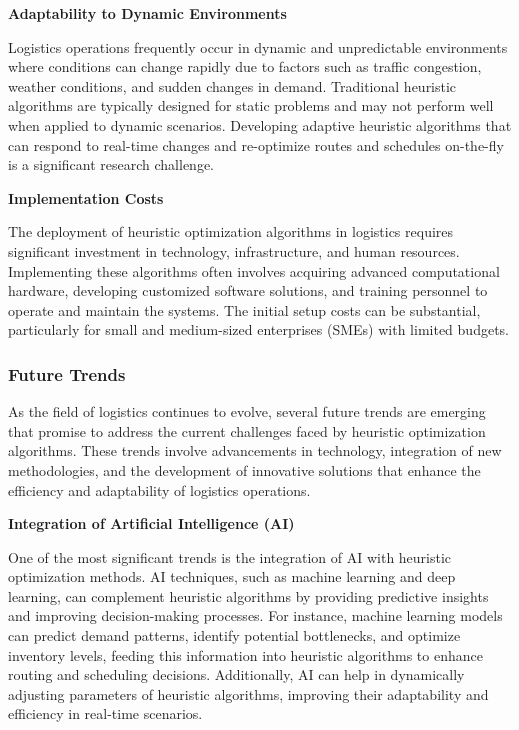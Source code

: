 \documentclass{article}
\begin{document}
    \textbf{Adaptability to Dynamic Environments}

    Logistics operations frequently occur in dynamic and unpredictable environments where conditions can change rapidly due to factors such as traffic congestion, weather conditions, and sudden changes in demand. Traditional heuristic algorithms are typically designed for static problems and may not perform well when applied to dynamic scenarios. Developing adaptive heuristic algorithms that can respond to real-time changes and re-optimize routes and schedules on-the-fly is a significant research challenge. \cite{Ochelska2021}

    \textbf{Implementation Costs}

    The deployment of heuristic optimization algorithms in logistics requires significant investment in technology, infrastructure, and human resources. Implementing these algorithms often involves acquiring advanced computational hardware, developing customized software solutions, and training personnel to operate and maintain the systems. The initial setup costs can be substantial, particularly for small and medium-sized enterprises (SMEs) with limited budgets. \cite{Puri2023}

    \subsubsection{Future Trends}\label{subsec:future-trends}

    As the field of logistics continues to evolve, several future trends are emerging that promise to address the current challenges faced by heuristic optimization algorithms. These trends involve advancements in technology, integration of new methodologies, and the development of innovative solutions that enhance the efficiency and adaptability of logistics operations.

    \textbf{Integration of Artificial Intelligence (AI)}

    One of the most significant trends is the integration of AI with heuristic optimization methods. AI techniques, such as machine learning and deep learning, can complement heuristic algorithms by providing predictive insights and improving decision-making processes. For instance, machine learning models can predict demand patterns, identify potential bottlenecks, and optimize inventory levels, feeding this information into heuristic algorithms to enhance routing and scheduling decisions. Additionally, AI can help in dynamically adjusting parameters of heuristic algorithms, improving their adaptability and efficiency in real-time scenarios. \cite{Puri2023}
\end{document}

